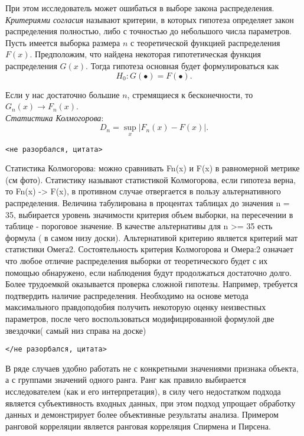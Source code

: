 \documentclass[12pt]{article}
\begin{document}
При этом исследователь может ошибаться в выборе закона распределения. \emph{Критериями согласия} называют критерии, в которых гипотеза определяет закон распределения полностью, либо с точностью до небольшого числа параметров. Пусть имеется выборка размера $n$ с теоретической функцией распределения $F(x)$. Предположим, что найдена некоторая гипотетическая функция распределения $G(x)$. Тогда гипотеза основная будет формулироваться как 
\[ H_0: G(\bullet) = F(\bullet). \]

Если у нас достаточно большие $n$, стремящиеся к бесконечности, то $G_n(x) \to F_n(x)$.\\


\emph{Статистика Колмогорова}:
\[  D_n = \sup_x | F_n(x) - F(x) |.\]

\begin{verbatim}<не разорбался, цитата>\end{verbatim}
Статистика Колмогорова: можно сравнивать Fn(x) и F(x) в равномерной метрике (см фото). Статистику называют статистикой Колмогорова, если гипотеза верна, то Fn(x) -> F(x), в противном случае отвергается в пользу альтернативного распределения. Величина табулирована в процентах таблицах до значения n = 35, выбирается уровень значимости критерия объем выборки, на пересечении в таблице - пороговое значение. В качестве альтернативы для n >= 35 есть формула ( в самом низу доски). Альтернативой критерию является критерий мат статистики Омега2. Состоятельность критерия Колмогорова и Омера:2 означает что любое отличие распределения выборки от теоретического будет с их помощью обнаружено, если наблюдения будут продолжаться достаточно долго. Более трудоемкой оказывается проверка сложной гипотезы. Например, требуется подтвердить наличие распределения. Необходимо на основе метода максимального правдоподобия получить некоторую оценку неизвестных параметров, после чего воспользоваться модифицированной формулой две звездочки( самый низ справа на доске)
\begin{verbatim}</не разорбался, цитата>\end{verbatim}

В ряде случаев удобно работать не с конкретными значениями признака объекта, а с группами значений одного ранга. Ранг как правило выбирается исследователем (как и его интерпретация), в силу чего недостатком подхода является субъективность входных данных, при этом подход упрощает обработку данных и демонстрирует более объективные результаты анализа. Примером ранговой корреляции является ранговая корреляция Спирмена и Пирсена. 
\end{document}
